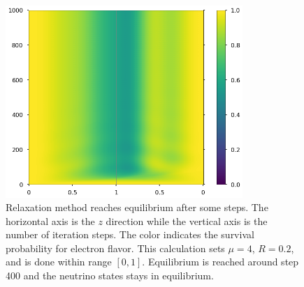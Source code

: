 \begin{figure}[htbp]
    \centering
    \includegraphics[width=0.8\textwidth]{chapters/assets/halo/relax-color.png}
    \caption{Relaxation method reaches equilibrium after some steps. The horizontal axis is the $z$ direction while the vertical axis is the number of iteration steps. The color indicates the survival probability for electron flavor. This calculation sets $\mu = 4$, $R=0.2$, and is done within range $[0,1]$. Equilibrium is reached around step 400 and the neutrino states stays in equilibrium.}
    \label{chap:halo-sec:num-fig:relax-color}
\end{figure}






